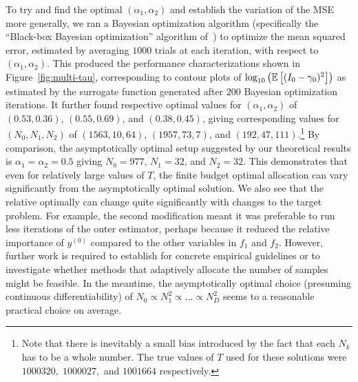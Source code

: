 To 
try and find the optimal $(\alpha_1,\alpha_2)$ and establish the variation of the MSE more generally,
we ran a Bayesian optimization
algorithm (specifically the ``Black-box Bayesian optimization'' algorithm of~\cite{rainforth2015workshopbopp}) to
optimize the mean squared error, estimated by averaging $1000$ trials at each iteration, with respect to 
$(\alpha_1,\alpha_2)$.  This produced the performance characterizations shown in
Figure~\ref{fig:multi-tau}, corresponding to contour plots of $\log_{10} \left(\mathbb{E} \left[(I_0-\gamma_0)^2\right]\right)$ as
estimated by the surrogate function generated after $200$ Bayesian optimization iterations.
It further found respective optimal values for $(\alpha_1,\alpha_2)$ of  $(0.53,0.36)$, $(0.55,0.69)$, and $(0.38,0.45)$,
giving corresponding values for $(N_0,N_1,N_2)$
of $(1563,10,64)$, $(1957,73,7)$, and $(192,47,111)$.\footnote{Note that there is inevitably a small bias introduced
	by the fact that each $N_k$ has to be a whole number.  The true values of $T$ used for these solutions
	were $1000320,\; 1000027,$ and $1001664$ respectively.}  By comparison, the asymptotically optimal
setup suggested by our theoretical results is $\alpha_1=\alpha_2=0.5$ giving $N_0=977$, $N_1=32$, and 
$N_2=32$.
This demonstrates that even for relatively large values of $T$, the finite budget optimal allocation can vary significantly
from the asymptotically optimal solution.  We also see that the relative optimally can change quite significantly with
changes to the target problem.  For example, the second modification meant it was preferable to run less iterations of
the outer estimator, perhaps because it reduced the relative importance of $y^{(0)}$ compared to the other variables
in $f_1$ and $f_2$.  However, further work is required to
establish for concrete empirical guidelines or to investigate whether methods that adaptively allocate the number of
samples might be feasible.  In the meantime, the asymptotically optimal choice (presuming continuous differentiability) 
of $N_0 \propto N_1^2 \propto \dots \propto N_D^2$ seems to a reasonable practical choice on average.

